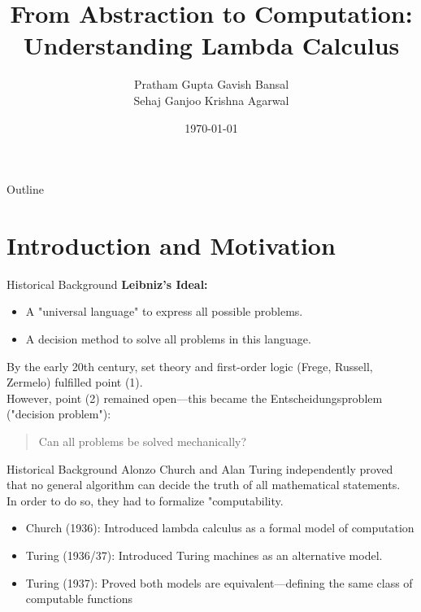 \documentclass{beamer}
\title{From Abstraction to Computation: \\ Understanding Lambda Calculus}
\author{Pratham Gupta  Gavish Bansal\\
        Sehaj Ganjoo  Krishna Agarwal}
\institute{Indian Institute of Science, Bengaluru}
\date{\today}
\begin{document}
\begin{frame}
  \titlepage
\end{frame}

\begin{frame}{Outline}
  \tableofcontents
\end{frame}

\section{Introduction and Motivation}

\begin{frame}{Historical Background}
\textbf{Leibniz’s Ideal:}
\begin{itemize}
    \item A "universal language" to express all possible problems.
    \item A decision method to solve all problems in this language.
\end{itemize}
\bigskip
By the early 20th century, set theory and first-order logic (Frege, Russell, Zermelo) fulfilled point (1).\\
However, point (2) remained open—this became the Entscheidungsproblem ("decision problem"):\\
\begin{quote}
    Can all problems be solved mechanically?
\end{quote}
\end{frame}
\begin{frame}{Historical Background}
Alonzo Church and Alan Turing independently proved that no general algorithm can decide the truth of all mathematical statements.\\
In order to do so, they had to formalize "computability.\\
\begin{itemize}
    \item Church (1936): Introduced lambda calculus as a formal model of computation
    \item Turing (1936/37): Introduced Turing machines as an alternative model.
    \item Turing (1937): Proved both models are equivalent—defining the same class of computable functions
\end{itemize}

\end{frame}
\end{document}
